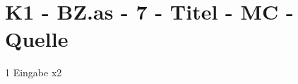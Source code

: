 \section{K1 - BZ.as - 7 - Titel - MC - Quelle}

\begin{langesbeispiel} \item[1] %
Eingabe x2
\end{langesbeispiel}